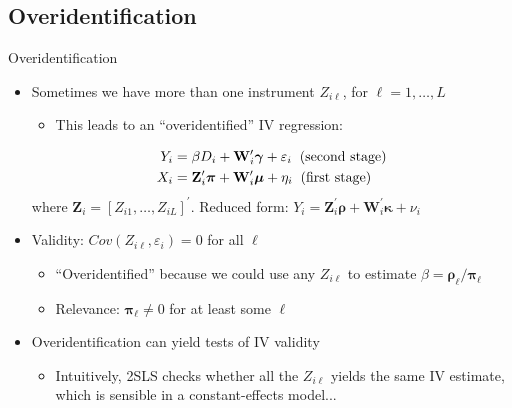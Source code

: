 \documentclass{beamer}
\begin{document}
\subsection{Overidentification}
\begin{frame}{Overidentification}
\begin{itemize}
\item Sometimes we have more than one instrument $Z_{i\ell}$, for $\ell=1,\dots,L$
\smallskip
\begin{itemize}\pause{}
\item This leads to an ``overidentified'' IV regression:
\end{itemize}
\vspace{-0.3cm}
\begin{align*}
Y_i &=  \beta D_i +\mathbf{W}_i^\prime\boldsymbol{\gamma} +  \varepsilon_i\hspace{0.2cm}\text{(second stage)}\\
X_i &= \mathbf{Z}_i^\prime\boldsymbol{\pi} + \mathbf{W}_i^\prime\boldsymbol{\mu} + \eta_i\hspace{0.2cm}\text{(first stage)}
\end{align*}
where $\mathbf{Z}_i=[Z_{i1},\dots,Z_{iL}]^\prime$. Reduced form: $Y_i= \mathbf{Z}_i^\prime\boldsymbol{\rho} + \mathbf{W}_i^\prime\boldsymbol{\kappa}+\nu_i $\pause{}\medskip

\item Validity: $Cov(Z_{i\ell},\varepsilon_i)=0$ for all $\ell$\smallskip
\begin{itemize}
\item ``Overidentified'' because we could use any $Z_{i\ell}$ to estimate $\beta=\boldsymbol{\rho}_\ell/\boldsymbol{\pi}_\ell$\pause{}\smallskip
\item Relevance: $\boldsymbol{\pi}_\ell\neq 0$ for at least some $\ell$
\end{itemize}\pause{}\medskip

\item Overidentification can yield tests of IV validity\smallskip
\begin{itemize}
\item Intuitively, 2SLS checks whether all the $Z_{i\ell}$ yields the same IV estimate, which is sensible in a constant-effects model...
\end{itemize}
\end{itemize}
\end{frame}
\end{document}
